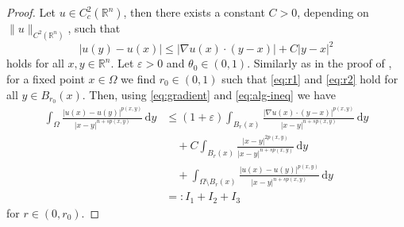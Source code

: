 \documentclass[11pt]{amsart}
\theoremstyle{plain}
\theoremstyle{definition}
\numberwithin{equation}{section}
\begin{document}
\begin{proof}
Let $u \in C^{2}_{c}(\mathbb{R}^{n})$, then there exists a constant $C > 0$, depending on $\|u\|_{C^{2}(\mathbb{R}^{n})}$, such that
\begin{equation} \label{eq:gradient}
|u(y)-u(x)| \leq |\nabla u(x) \cdot (y-x)| + C|y-x|^2
\end{equation}
holds for all $x, y \in \mathbb{R}^{n}$. Let $\varepsilon > 0$ and $\theta_{0} \in (0,1)$. Similarly as in the proof of , for a fixed point $x \in \Omega$ we find $r_{0} \in (0,1)$ such that \eqref{eq:r1} and \eqref{eq:r2} hold for all $y \in B_{r_{0}}(x)$. Then, using \eqref{eq:gradient} and \eqref{eq:alg-ineq} we have
\begin{equation} \label{eq:limsup-I12}
\begin{split}
\int_{\Omega} \frac{|u(x)-u(y)|^{p(x, y)}}{|x-y|^{n+sp(x, y)}} \,\mathrm{d}y
&\leq (1+\varepsilon) \int_{B_{r}(x)} \frac{|\nabla u(x) \cdot (y-x)|^{p(x, y)}}{|x-y|^{n+sp(x, y)}} \,\mathrm{d}y \\
&\quad + C \int_{B_{r}(x)} \frac{|x-y|^{2p(x, y)}}{|x-y|^{n+sp(x, y)}} \,\mathrm{d}y \\
&\quad + \int_{\Omega \setminus B_{r}(x)} \frac{|u(x)-u(y)|^{p(x, y)}}{|x-y|^{n+sp(x, y)}} \,\mathrm{d}y \\
&=: I_{1} + I_{2} + I_{3}
\end{split}
\end{equation}
for $r \in (0, r_{0})$.


\end{proof}
\end{document}
